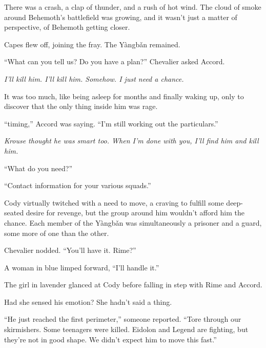 There was a crash, a clap of thunder, and a rush of hot wind.  The cloud of smoke around Behemoth's battlefield was growing, and it wasn't just a matter of perspective, of Behemoth getting closer.



Capes flew off, joining the fray.  The Y\`{a}ngb\v{a}n remained.



``What can you tell us?  Do you have a plan?'' Chevalier asked Accord.



\emph{I'll kill him.  I'll kill him.  Somehow.  I just need a chance.}



It was too much, like being asleep for months and finally waking up, only to discover that the only thing inside him was rage.



``\ldotsoptimal timing,'' Accord was saying.  ``I'm still working out the particulars.''



\emph{Krouse thought he was smart too.  When I'm done with you, I'll find him and kill him.  }



``What do you need?''



``Contact information for your various squads.''



Cody virtually twitched with a need to move, a craving to fulfill some deep-seated desire for revenge, but the group around him wouldn't afford him the chance.  Each member of the Y\`{a}ngb\v{a}n was simultaneously a prisoner and a guard, some more of one than the other.



Chevalier nodded.  ``You'll have it.  Rime?''



A woman in blue limped forward, ``I'll handle it.''



The girl in lavender glanced at Cody before falling in step with Rime and Accord.



Had she sensed his emotion?  She hadn't said a thing.



``He just reached the first perimeter,'' someone reported.  ``Tore through our skirmishers.  Some teenagers were killed.  Eidolon and Legend are fighting, but they're not in good shape.  We didn't expect him to move this fast.''



